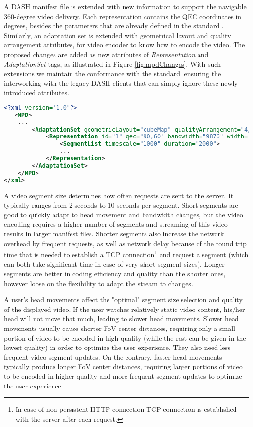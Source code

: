 A DASH manifest file is extended with new information to support the navigable 360-degree video delivery. Each representation contains the QEC coordinates in degrees, besides the parameters that are already defined in the standard \cite{}. Similarly, an adaptation set is extended with geometrical layout and quality arrangement attributes, for video encoder to know how to encode the video. The proposed changes are added as new attributes of \textit{Representation} and \textit{AdaptationSet} tags, as illustrated in Figure \ref{fig:mpdChanges}. With such extensions we maintain the conformance with the standard, ensuring the interworking with the legacy DASH clients that can simply ignore these newly introduced attributes.


\begin{lstlisting}[language=xml, frame=single, backgroundcolor=\color{white}, caption=Extensions of MPD file]
<?xml version="1.0"?>
   <MPD>
    ...
        <AdaptationSet geometricLayout="cubeMap" qualityArrangement="4/1/1">
            <Representation id="1" qec="90,60" bandwidth="9876" width="1920" height="1080" frameRate="30">
                <SegmentList timescale="1000" duration="2000">
                ...
            </Representation>
        </AdaptationSet>
    </MPD>
</xml>
\end{lstlisting}
\label{fig:mpdChanges}


A video segment size determines how often requests are sent to the server. It typically ranges from 2 seconds to 10 seconds per segment. Short segments are good to quickly adapt to head movement and bandwidth changes, but the video encoding requires a higher number of segments and streaming of this video results in larger manifest files. Shorter segments also increase the network overhead by frequent requests, as well as network delay because of the round trip time that is needed to establish a TCP connection\footnote{In case of non-persistent HTTP connection TCP connection is established with the server after each request.} and request a segment (which can both take significant time in case of very short segment sizes). Longer segments are better in coding efficiency and quality than the shorter ones, however loose on the flexibility to adapt the stream to changes.

A user's head movements affect the "optimal" segment size selection and quality of the displayed video. If the user watches relatively static video content, his/her head will not move that much, leading to slower head movements. Slower head movements usually cause shorter FoV center distances, requiring only a small portion of video to be encoded in high quality (while the rest can be given in the lowest quality) in order to optimize the user experience. They also need less frequent video segment updates. On the contrary, faster head movements typically produce longer FoV center distances,  requiring larger portions of video to be encoded in higher quality and more frequent segment updates to optimize the user experience.

